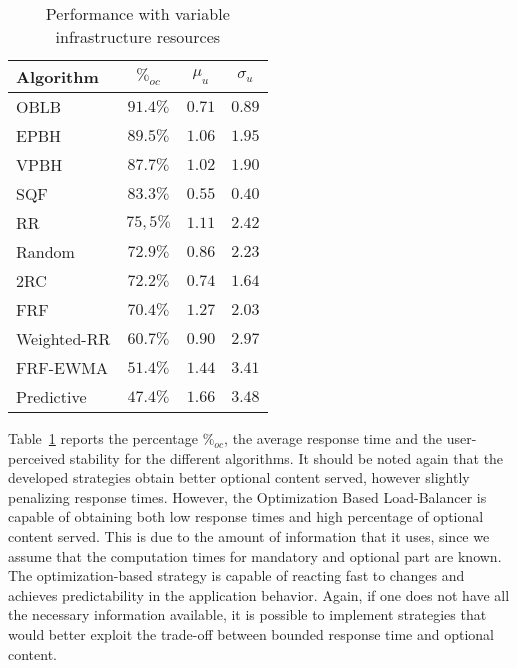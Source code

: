 \begin{table}
\centering
\caption{Performance with variable infrastructure resources}
\label{tab:resourcechanges-performance}
\begin{tabular}{l c c c}
\hline
Algorithm   & $\%_{oc}$ & $\mu_u$ & $\sigma_u$ \\
\hline
OBLB        & $\mathbf{91.4\%}$ & $0.71$          & $0.89$ \\
EPBH        & $89.5\%$          & $1.06$          & $1.95$ \\
VPBH        & $87.7\%$          & $1.02$          & $1.90$ \\
SQF         & $83.3\%$          & $\mathbf{0.55}$ & $\mathbf{0.40}$ \\
RR          & $75,5\%$          & $1.11$          & $2.42$ \\
Random      & $72.9\%$          & $0.86$          & $2.23$ \\
2RC         & $72.2\%$          & $0.74$          & $1.64$ \\
FRF         & $70.4\%$          & $1.27$          & $2.03$ \\
Weighted-RR & $60.7\%$          & $0.90$          & $2.97$ \\
FRF-EWMA    & $51.4\%$          & $1.44$          & $3.41$ \\
Predictive  & $47.4\%$          & $1.66$          & $3.48$ \\
\hline
\end{tabular}
\vspace{-4mm}
\end{table}

Table~\ref{tab:resourcechanges-performance} reports the percentage
$\%_{oc}$, the average response time and the user-perceived stability
for the different algorithms. It should be noted again that the
developed strategies obtain better optional content served, however
slightly penalizing response times. However, the Optimization Based
Load-Balancer is capable of obtaining both low response times and high
percentage of optional content served. This is due to the amount of
information that it uses, since we assume that the computation times
for mandatory and optional part are known. The optimization-based
strategy is capable of reacting fast to changes and achieves
predictability in the application behavior. Again, if one does not
have all the necessary information available, it is possible to
implement strategies that would better exploit the trade-off between
bounded response time and optional content.

